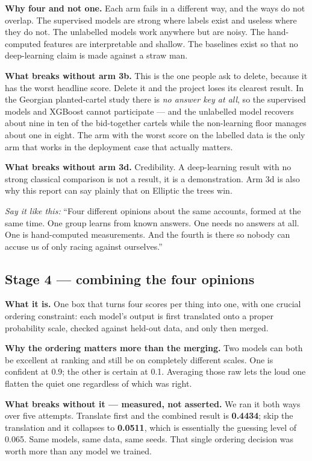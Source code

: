 \documentclass[11pt,a4paper]{article}
\newcommand{\aloud}[1]{\par\smallskip\noindent\textit{\textcolor{accent}{Say
it like this:}} ``#1''\par\smallskip}
\begin{document}
\textbf{Why four and not one.} Each arm fails in a different way, and the ways
do not overlap. The supervised models are strong where labels exist and useless
where they do not. The unlabelled models work anywhere but are noisy. The
hand-computed features are interpretable and shallow. The baselines exist so
that no deep-learning claim is made against a straw man.

\textbf{What breaks without arm 3b.} This is the one people ask to delete,
because it has the worst headline score. Delete it and the project loses its
clearest result. In the Georgian planted-cartel study there is \emph{no answer
key at all}, so the supervised models and XGBoost cannot participate --- and the
unlabelled model recovers about nine in ten of the bid-together cartels while
the non-learning floor manages about one in eight. The arm with the worst score
on the labelled data is the only arm that works in the deployment case that
actually matters.

\textbf{What breaks without arm 3d.} Credibility. A deep-learning result with
no strong classical comparison is not a result, it is a demonstration. Arm 3d is
also why this report can say plainly that on Elliptic the trees win.

\aloud{Four different opinions about the same accounts, formed at the same time.
One group learns from known answers. One needs no answers at all. One is
hand-computed measurements. And the fourth is there so nobody can accuse us of
only racing against ourselves.}

\subsection{Stage 4 --- combining the four opinions}

\textbf{What it is.} One box that turns four scores per thing into one, with
one crucial ordering constraint: each model's output is first translated onto a
proper probability scale, checked against held-out data, and only then merged.

\textbf{Why the ordering matters more than the merging.} Two models can both be
excellent at ranking and still be on completely different scales. One is
confident at 0.9; the other is certain at 0.1. Averaging those raw lets the loud
one flatten the quiet one regardless of which was right.

\textbf{What breaks without it --- measured, not asserted.} We ran it both ways
over five attempts. Translate first and the combined result is
\textbf{0.4434}; skip the translation and it collapses to \textbf{0.0511},
which is essentially the guessing level of 0.065. Same models, same data, same
seeds. That single ordering decision was worth more than any model we trained.
\end{document}
